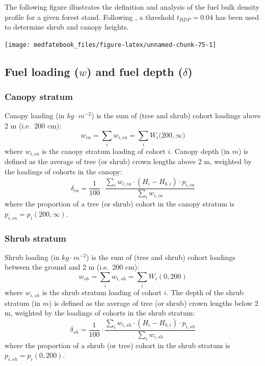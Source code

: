 \documentclass[]{book}
\begin{document}
The following figure illustrates the definition and analysis of the fuel bulk density profile for a given forest stand. Following \citet{Mitsopoulos2007}, a threshold \(t_{BDP} = 0.04\) has been used to determine shrub and canopy heights.

\begin{center}\texttt{[image: medfatebook\_files/figure-latex/unnamed-chunk-75-1]} \end{center}

\hypertarget{fuel-loading-w-and-fuel-depth-delta}{%
\subsection{\texorpdfstring{Fuel loading (\(w\)) and fuel depth (\(\delta\))}{Fuel loading (w) and fuel depth (\textbackslash{}delta)}}\label{fuel-loading-w-and-fuel-depth-delta}}

\hypertarget{canopy-stratum}{%
\subsubsection{Canopy stratum}\label{canopy-stratum}}

Canopy loading (in \(kg\cdot m^{-2}\)) is the sum of (tree and shrub) cohort loadings above 2 m (i.e.~200 cm):
\begin{equation}
w_{ca} = \sum_{i}w_{i,ca} =\sum_{i}{W_i(200, \infty})
\end{equation}
where \(w_{i,ca}\) is the canopy stratum loading of cohort \(i\). Canopy depth (in \(m\)) is defined as the average of tree (or shrub) crown lengths above 2 m, weighted by the loadings of cohorts in the canopy:
\begin{equation}
\delta_{ca} = \frac{1}{100}\cdot\frac{\sum_{i}{w_{i,ca}\cdot (H_i - H_{b,i})\cdot p_{i,ca} }}{\sum_{i}{w_{i,ca}}}
\end{equation}
where the proportion of a tree (or shrub) cohort in the canopy stratum is \(p_{i,ca}=p_{i}(200,\infty)\).

\hypertarget{shrub-stratum}{%
\subsubsection{Shrub stratum}\label{shrub-stratum}}

Shrub loading (in \(kg\cdot m^{-2}\)) is the sum of (tree and shrub) cohort loadings between the ground and 2 m (i.e.~200 cm):
\begin{equation}
w_{sh} = \sum_{i}w_{i,sh} =\sum_{i}W_i(0, 200)
\end{equation}
where \(w_{i,sh}\) is the shrub stratum loading of cohort \(i\). The depth of the shrub stratum (in \(m\)) is defined as the average of tree (or shrub) crown lengths below 2 m, weighted by the loadings of cohorts in the shrub stratum:
\begin{equation}
\delta_{sh} = \frac{1}{100}\cdot \frac{\sum_{i}{w_{i,sh}\cdot (H_i - H_{b,i})\cdot p_{i,sh} }}{\sum_{i}{w_{i,sh}}}
\end{equation}
where the proportion of a shrub (or tree) cohort in the shrub stratum is \(p_{i,sh}=p_{i}(0,200)\).
\end{document}
